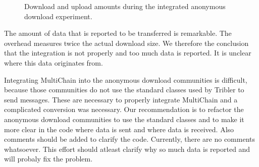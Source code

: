 \begin{figure}
\centering
{}
\caption{Download and upload amounts during the integrated anonymous download experiment.}
\label{fig:integrated-anonymous-amounts}
\end{figure}

The amount of data that is reported to be transferred is remarkable.
The overhead measures twice the actual download size.
We therefore the conclusion that the integration is not properly and too much data is reported.
It is unclear where this data originates from.

Integrating MultiChain into the anonymous download communities is difficult,
because those communities do not use the standard classes used by Tribler to send messages.
These are necessary to properly integrate MultiChain and a complicated conversion was necessary.
Our recommendation is to refactor the anonymous download communities to use the standard classes
and to make it more clear in the code where data is sent and where data is received.
Also comments should be added to clarify the code.
Currently, there are no comments whatsoever.
This effort should atleast clarify why so much data is reported and will probaly fix the problem.